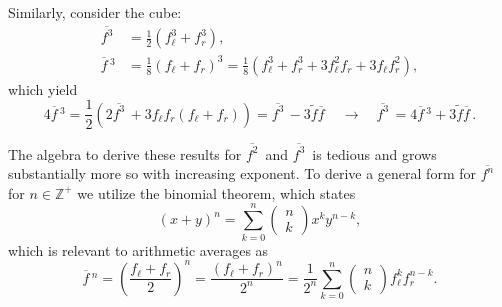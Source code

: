\documentclass[10pt]{article}
\newcommand{\avg}[1]{\overline{#1}\,}
\newcommand{\invavg}[1]{\widetilde{#1}}
\begin{document}
Similarly, consider the cube:
\begin{equation}
	\begin{aligned}
		\avg{f^3} &= \frac{1}{2}(f_\ell^3 + f_r^3), \\
		\avg{f}^3 &= \frac{1}{8}(f_\ell + f_r)^3 = \frac{1}{8}(f_\ell^3 + f_r^3 + 3f_\ell^2 f_r + 3f_\ell f_r^2),
	\end{aligned}
\end{equation}
which yield
\begin{equation}
	4\avg{f}^3 = \frac{1}{2}(2\avg{f^3} + 3f_\ell f_r(f_\ell + f_r)) = \avg{f^3} - 3\invavg{f}\avg{f} \quad \rightarrow \quad \avg{f^3} = 4\avg{f}^3 + 3\invavg{f}\avg{f}.
\end{equation}

The algebra to derive these results for $\avg{f^2}$ and $\avg{f^3}$ is tedious and grows substantially more so with increasing exponent.
To derive a general form for $\avg{f^n}$ for $n\in\mathbb{Z}^+$ we utilize the binomial theorem, which states
\begin{equation}
	(x+y)^n = \sum_{k=0}^{n}\begin{pmatrix}n \\ k\end{pmatrix}x^ky^{n-k},
\end{equation}
which is relevant to arithmetic averages as
\begin{equation}
	\avg{f}^n = \left(\frac{f_\ell+f_r}{2}\right)^n = \frac{(f_\ell+f_r)^n}{2^n} = \frac{1}{2^n}\sum_{k=0}^{n}\begin{pmatrix}n \\ k\end{pmatrix}f_\ell^kf_r^{n-k}.
\end{equation}
\end{document}
